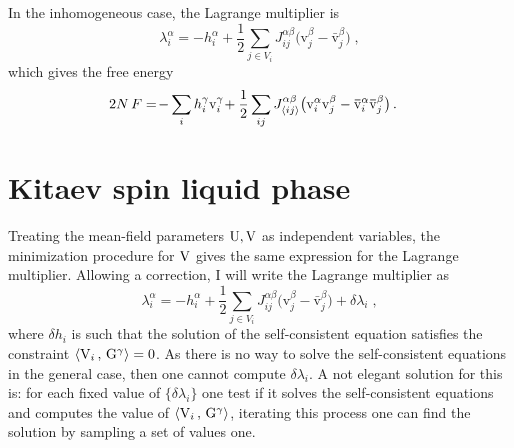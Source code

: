 In the inhomogeneous case, the Lagrange multiplier is
\begin{equation}
    \lambda_i^\alpha = - h^\alpha_i + \frac{1}{2} \!\! \sum_{j \in V_i} J^{\alpha\beta}_{ij}
    \big( \mathrm{v}^\beta_j-\bar{\mathrm{v}}^\beta_j\big)  \; ,
\end{equation}
which gives the free energy
\begin{align}
\begin{split}
    2N \, F
   &=  \!-\sum_{i}  h_i^\gamma    \mathrm{v}^\gamma_i \!+\frac{1}{2} \sum_{ij}J^{\alpha\beta}_{\braket{ij}} \big( \mathrm{v}^\alpha_i \mathrm{v}^\beta_j-
    \bar{\mathrm{v}}^\alpha_i  \bar{\mathrm{v}}^\beta_j\big)  \,  .
\end{split}
\end{align}




\section{Kitaev spin liquid phase}\label{sec:B-lag}
Treating the mean-field parameters $\mathrm{U}, \mathrm{V}$ as independent variables, the minimization procedure for $\mathrm{V}$ gives the same expression for the Lagrange multiplier. Allowing a correction, I will write the Lagrange multiplier as
\begin{equation}
    \lambda_i^\alpha = - h^\alpha_i + \frac{1}{2}  \sum_{j \in V_i} J^{\alpha\beta}_{ij}
    \big( \mathrm{v}^\beta_j-\bar{\mathrm{v}}^\beta_j\big) + \delta \lambda_i  \; , \label{B:lagrange-multiplier}
\end{equation}
where $\delta h_i$ is such that the solution of the self-consistent equation satisfies the constraint $\braket{ \mathrm{V}_{i} \, , \,  \mathrm{G}^\gamma } =0$. As there is no way to solve the self-consistent equations in the general case, then one cannot compute $ \delta \lambda_i$.   A not elegant solution for this is: for each fixed value of $\{\delta \lambda_i\}$ one test if it solves the self-consistent equations and computes the value of $\braket{ \mathrm{V}_{i} \, , \,  \mathrm{G}^\gamma }$, iterating this process one can find the solution by sampling a set of values one.

